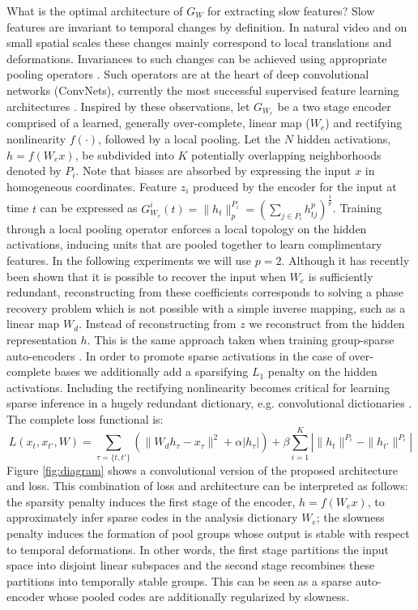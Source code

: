 \documentclass{article} %
\begin{document}
What is the optimal architecture of $G_{W}$ for extracting slow features? Slow features are invariant to temporal changes by definition. In natural video and on small spatial scales these changes mainly correspond to local translations and deformations. Invariances to such changes can be achieved using appropriate pooling operators \cite{JoanScat,LeCun1998}. 
Such operators are at the heart of deep convolutional networks (ConvNets), currently the most successful supervised feature learning architectures \cite{ImageNet}. Inspired by these observations, let $G_{W_e}$ be a two stage encoder comprised of a learned, generally over-complete, linear map ($W_e$) and rectifying nonlinearity $f(\cdot)$, followed by a local pooling. Let the $N$ hidden activations, $h = f(W_ex)$, be subdivided into $K$ potentially overlapping neighborhoods denoted by $P_i$. Note that biases are absorbed by expressing the input $x$ in homogeneous coordinates. Feature $z_i$ produced by the encoder for the input at time $t$ can be expressed as $G_{W_e}^i(t) = \|h_t\|^{P_i}_p =\left(\sum_{j \in P_i} h_{tj}^{p} \right)^{\frac{1}{p}}$. Training through a local pooling operator enforces a local topology on the hidden activations, inducing units that are pooled together to learn complimentary features. In the following experiments we will use $p=2$. Although it has recently been shown that it is possible to recover the input when $W_e$ is sufficiently redundant, reconstructing from these coefficients corresponds to solving a phase recovery problem \cite{JoanPooling} which is not possible with a simple inverse mapping, such as a linear map $W_d$. Instead of reconstructing from $z$ we reconstruct from the hidden representation $h$. This is the same approach taken when training group-sparse auto-encoders \cite{groupSparsity}. In order to promote sparse activations in the case of over-complete bases we additionally add a sparsifying $L_1$ penalty on the hidden activations. Including the rectifying nonlinearity becomes critical for learning sparse inference in a hugely redundant dictionary, e.g. convolutional dictionaries \cite{LISTA}. The complete loss functional is: 
\begin{equation}
\label{eqn:loss}
L(x_t,x_{t'},W)= \sum_{\tau = \{t,t'\}} \left(\|W_d h_\tau - x_\tau\|^2 + \alpha|h_\tau| \right)+\beta \sum_{i=1}^K \left| \|h_t \|^{P_i} - \|h_{t'}\|^{P_i} \right|
\end{equation} 
Figure \ref{fig:diagram} shows a convolutional version of the proposed architecture and loss. 
This combination of loss and architecture can be interpreted as follows: the sparsity penalty induces the first stage of the encoder, $h=f(W_ex)$, to approximately infer sparse codes in the analysis dictionary $W_e$; the slowness penalty induces the formation of pool groups whose output is stable with respect to temporal deformations. In other words, the first stage partitions the input space into disjoint linear subspaces and the second stage recombines these partitions into temporally stable groups. This can be seen as a sparse auto-encoder whose pooled codes are additionally regularized by slowness.
\end{document}
